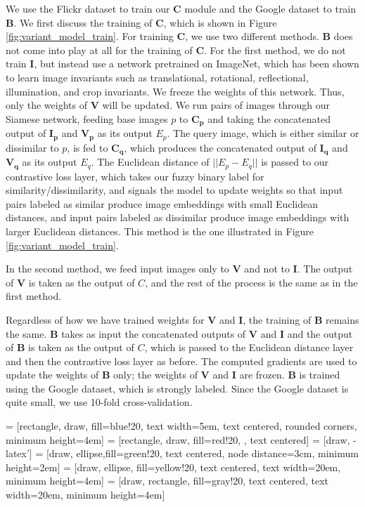 We use the Flickr dataset to train our $\mathbf{C}$ module and the Google dataset to train $\mathbf{B}$. We first discuss the training of $\mathbf{C}$, which is shown in Figure \ref{fig:variant_model_train}. For training $\mathbf{C}$, we use two different methods. $\mathbf{B}$ does not come into play at all for the training of $\mathbf{C}$. For the first method, we do not train $\mathbf{I}$, but instead use a network pretrained on ImageNet, which has been shown to learn image invariants such as translational, rotational, reflectional, illumination, and crop invariants. We freeze the weights of this network. Thus, only the weights of $\mathbf{V}$ will be updated. We run pairs of images through our Siamese network, feeding base images $p$ to $\mathbf{C_p}$ and taking the concatenated output of $\mathbf{I_p}$ and $\mathbf{V_p}$ as its output $E_p$. The query image, which is either similar or dissimilar to $p$, is fed to $\mathbf{C_q}$, which produces the concatenated output of $\mathbf{I_q}$ and $\mathbf{V_q}$ as its output $E_q$. The Euclidean distance of $||E_p - E_q||$ is passed to our contrastive loss layer, which takes our fuzzy binary label for similarity/dissimilarity, and signals the model to update weights so that input pairs labeled as similar produce image embeddings with small Euclidean distances, and input pairs labeled as dissimilar produce image embeddings with larger Euclidean distances. This method is the one illustrated in Figure \ref{fig:variant_model_train}.

In the second method, we feed input images only to $\mathbf{V}$ and not to $\mathbf{I}$. The output of $\mathbf{V}$ is taken as the output of $C$, and the rest of the process is the same as in the first method.

Regardless of how we have trained weights for $\mathbf{V}$ and $\mathbf{I}$, the training of $\mathbf{B}$ remains the same. $\mathbf{B}$ takes as input the concatenated outputs of $\mathbf{V}$ and $\mathbf{I}$ and the output of $\mathbf{B}$ is taken as the output of $C$, which is passed to the Euclidean distance layer and then the contrastive loss layer as before. The computed gradients are used to update the weights of $\mathbf{B}$ only; the weights of $\mathbf{V}$ and $\mathbf{I}$ are frozen. $\mathbf{B}$ is trained using the Google dataset, which is strongly labeled. Since the Google dataset is quite small, we use 10-fold cross-validation.


 = [rectangle, draw, fill=blue!20, 
text width=5em, text centered, rounded corners, minimum height=4em]
 = [rectangle, draw, fill=red!20, , text centered]
 = [draw, -latex']
 = [draw, ellipse,fill=green!20, text centered, node distance=3cm,
minimum height=2em]
 = [draw, ellipse, fill=yellow!20, text centered,  text width=20em, minimum height=4em]
 = [draw, rectangle, fill=gray!20, text centered,  text width=20em, minimum height=4em]

